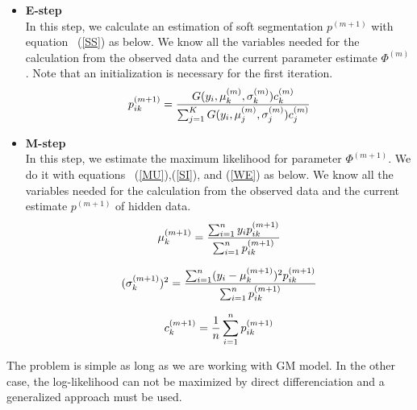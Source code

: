 \begin{itemize}

\item \textbf{E-step}\\
In this step, we calculate an estimation of soft segmentation $p^{(m+1)}$ with equation ~(\ref{SS}) as below. We know all the variables needed for the calculation from the observed data and the current parameter estimate $\Phi^{(m)}$. Note that an initialization is necessary for the first iteration.\\

  \begin{equation*}
  p_{ik}^{(m+1)}= \frac{G(y_i,\mu_k^{(m)},\sigma_k^{(m)})c_k^{(m)}}{\sum_{j=1}^K G(y_i,\mu_j^{(m)},\sigma_j^{(m)})c_j^{(m)}}\\
  \end{equation*}

\item \textbf{M-step}\\
In this step, we estimate the maximum likelihood for parameter $\Phi^{(m+1)}$. We do it with equations ~(\ref{MU}),(\ref{SI}), and (\ref{WE}) as below. We know all the variables needed for the calculation from the observed data and the current estimate $p^{(m+1)}$ of hidden data.\\

  \begin{equation*}
  \mu_k^{(m+1)} = \frac{\sum_{i=1}^n y_ip_{ik}^{(m+1)}}{\sum_{i=1}^n p_{ik}^{(m+1)}}\\
  \end{equation*}

  \begin{equation*}
  (\sigma_k^{(m+1)})^2 = \frac{\sum_{i=1}^n (y_i-\mu_k^{(m+1)})^2p_{ik}^{(m+1)}}{\sum_{i=1}^n p_{ik}^{(m+1)}}\\
  \end{equation*}
  
  \begin{equation*}
  c_k^{(m+1)} = \frac{1}{n}\sum_{i=1}^n p_{ik}^{(m+1)}\\
  \end{equation*}
\end{itemize}

The problem is simple as long as we are working with GM model. In the other case, the log-likelihood can not be maximized by direct differenciation and a generalized approach must be used.
%

